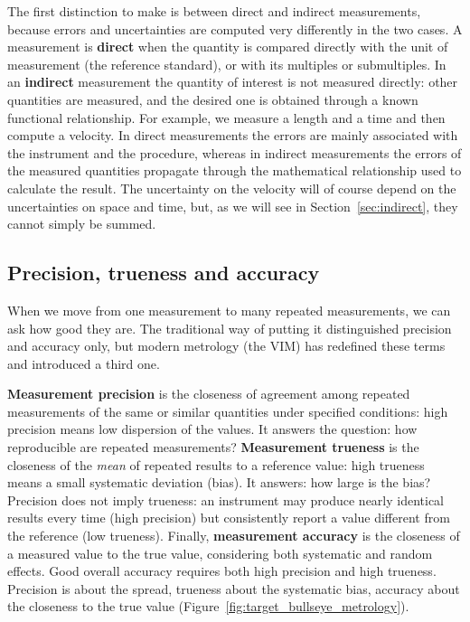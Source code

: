 \documentclass[letterpaper,11pt,leqno]{book}
\begin{document}
The first distinction to make is between direct and indirect measurements, because errors and uncertainties are computed very differently in the two cases. A measurement is \textbf{direct} when the quantity is compared directly with the unit of measurement (the reference standard), or with its multiples or submultiples. In an \textbf{indirect} measurement the quantity of interest is not measured directly: other quantities are measured, and the desired one is obtained through a known functional relationship. For example, we measure a length and a time and then compute a velocity. In direct measurements the errors are mainly associated with the instrument and the procedure, whereas in indirect measurements the errors of the measured quantities propagate through the mathematical relationship used to calculate the result. The uncertainty on the velocity will of course depend on the uncertainties on space and time, but, as we will see in Section~\ref{sec:indirect}, they cannot simply be summed.

\subsection{Precision, trueness and accuracy}

When we move from one measurement to many repeated measurements, we can ask how good they are. The traditional way of putting it distinguished precision and accuracy only, but modern metrology (the VIM) has redefined these terms and introduced a third one.

\textbf{Measurement precision} is the closeness of agreement among repeated measurements of the same or similar quantities under specified conditions: high precision means low dispersion of the values. It answers the question: how reproducible are repeated measurements? \textbf{Measurement trueness} is the closeness of the \emph{mean} of repeated results to a reference value: high trueness means a small systematic deviation (bias). It answers: how large is the bias? Precision does not imply trueness: an instrument may produce nearly identical results every time (high precision) but consistently report a value different from the reference (low trueness). Finally, \textbf{measurement accuracy} is the closeness of a measured value to the true value, considering both systematic and random effects. Good overall accuracy requires both high precision and high trueness. Precision is about the spread, trueness about the systematic bias, accuracy about the closeness to the true value (Figure~\ref{fig:target_bullseye_metrology}).
\end{document}

